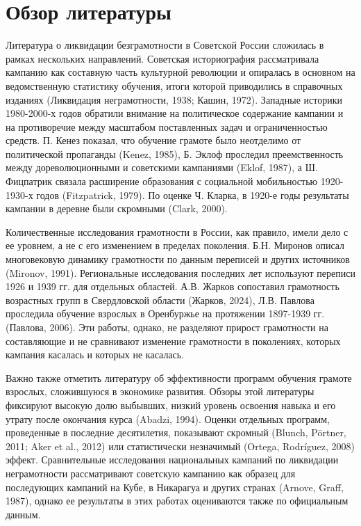 \documentclass[12pt]{article}
\begin{document}
\section{Обзор литературы}

Литература о ликвидации безграмотности в Советской России сложилась в рамках не\-сколь\-ких направлений. Советская историография рассматривала кампанию как составную часть культурной революции и опиралась в основном на ведомственную статистику обучения, итоги которой приводились в справочных изданиях (Ликвидация неграмотности, 1938; Кашин, 1972). Западные историки 1980-2000-х годов обратили внимание на политическое содержание кампании и на противоречие между масштабом поставленных задач и ограниченностью средств. П. Кенез показал, что обучение грамоте было неотделимо от политической пропаганды (Kenez, 1985), Б. Эклоф проследил преемственность между дореволюционными и советскими кампаниями (Eklof, 1987), а Ш. Фицпатрик связала расширение образования с социальной мобильностью 1920-1930-х годов (Fitzpatrick, 1979). По оценке Ч. Кларка, в 1920-е годы результаты кампании в деревне были скромными (Clark, 2000).

Количественные исследования грамотности в России, как правило, имели дело с ее уровнем, а не с его изменением в пределах поколения. Б.Н. Миронов описал многовековую динамику грамотности по данным переписей и других источников (Mironov, 1991). Региональные исследования последних лет используют переписи 1926 и 1939 гг. для отдельных областей. А.В. Жарков сопоставил грамотность возрастных групп в Свердловской области (Жарков, 2024), Л.В. Павлова проследила обучение взрослых в Оренбуржье на протяжении 1897-1939 гг. (Павлова, 2006). Эти работы, однако, не разделяют прирост грамотности на составляющие и не сравнивают изменение грамотности в поколениях, которых кампания касалась и которых не касалась.

Важно также отметить литературу об эффективности программ обучения грамоте взрослых, сложившуюся в экономике развития. Обзоры этой литературы фиксируют высокую долю выбывших, низкий уровень освоения навыка и его утрату после окончания курса (Abadzi, 1994). Оценки отдельных программ, проведенные в последние десятилетия, показывают скромный (Blunch, Pörtner, 2011; Aker et al., 2012) или статистически незначимый (Ortega, Rodríguez, 2008) эффект. Сравнительные исследования национальных кампаний по ликвидации неграмотности рассматривают советскую кампанию как образец для последующих кампаний на Кубе, в Никарагуа и других странах (Arnove, Graff, 1987), однако ее результаты в этих работах оцениваются также по официальным данным.
\end{document}
